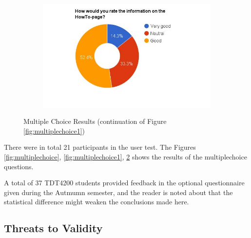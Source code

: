 \begin{figure}
    \hspace*{-1.5cm}
    \begin{subfigure}[h]{0.5\textwidth}
        \includegraphics[width=1.5\textwidth, height=1.0\textwidth]{results/howto_cmb.jpg}
        \caption{}
        \label{fig:cmb-howto}
    \end{subfigure}
    \caption{Multiple Choice Results (continuation of Figure \ref{fig:multiplechoice1})}
    \label{fig:multiplechoice2}
\end{figure}

There were in total 21 participants in the user test. The Figures \ref{fig:multiplechoice}, \ref{fig:multiplechoice1}, \ref{fig:multiplechoice2} shows the results of the multiplechoice questions.


A total of 37 TDT4200 students provided feedback in the optional questionnaire given during the Autmumn semester, and the reader is noted about that the statistical difference might weaken the conclusions made here.

\subsection{Threats to Validity}
